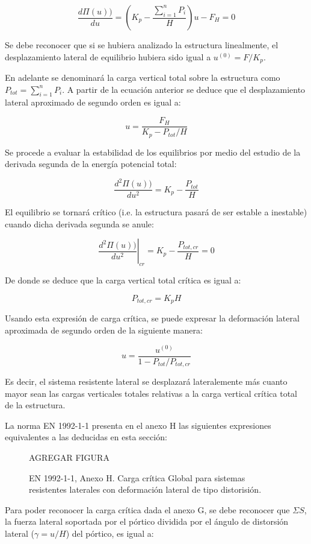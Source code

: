 $$\frac{d \Pi(u))}{d u} = \left(K_p-\frac{\sum_{i=1}^n P_i}{H}\right)u - F_H = 0$$

Se debe reconocer que si se hubiera analizado la estructura linealmente, el desplazamiento lateral de equilibrio hubiera sido igual a $u^{(0)}=F/K_p$.

En adelante se denominará la carga vertical total sobre la estructura como $P_{tot}=\sum_{i=1}^n P_i$. A partir de la ecuación anterior se deduce que el desplazamiento lateral aproximado de segundo orden es igual a:

$$u=\frac{F_H}{K_p - P_{tot}/H}$$

Se procede a evaluar la estabilidad de los equilibrios por medio del estudio de la derivada segunda de la energía potencial total:

$$\frac{d^2 \Pi(u))}{d u^2} = K_p-\frac{P_{tot}}{H}$$

El equilibrio se tornará crítico (i.e. la estructura pasará de ser estable a inestable) cuando dicha derivada segunda se anule:

$$\left.\frac{d^2 \Pi(u))}{d u^2}\right|_{cr} = K_p-\frac{P_{tot,cr}}{H}=0$$

De donde se deduce que la carga vertical total crítica es igual a:

$$P_{tot,cr} = K_p H$$

Usando esta expresión de carga crítica, se puede expresar la deformación lateral aproximada de segundo orden de la siguiente manera:

$$u=\frac{u^{(0)}}{1 - P_{tot}/P_{tot,cr}}$$

Es decir, el sistema resistente lateral se desplazará lateralemente más cuanto mayor sean las cargas verticales totales relativas a la carga vertical crítica total de la estructura.

La norma EN 1992-1-1 presenta en el anexo H las siguientes expresiones equivalentes a las deducidas en esta sección:

\begin{figure}[htb]
	\centering
	AGREGAR FIGURA
	\caption{EN 1992-1-1, Anexo H. Carga crítica Global para sistemas resistentes laterales con deformación lateral de tipo distorisión.}
	\label{fig:EN_Pcrit}
\end{figure}

Para poder reconocer la carga crítica dada el anexo G, se debe reconocer que $\Sigma S$, la fuerza lateral soportada por el pórtico dividida por el ángulo de distorsión lateral ($\gamma = u / H$) del pórtico, es igual a:

